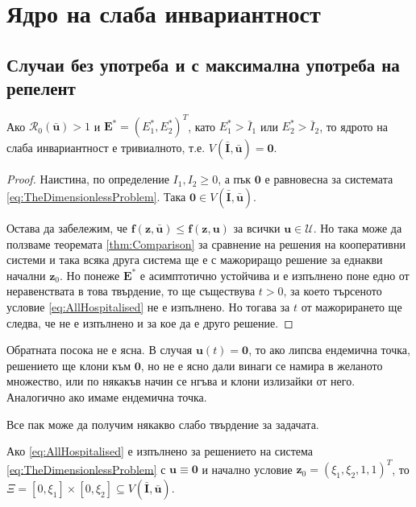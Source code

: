 \section{Ядро на слаба инвариантност}

\subsection{Случаи без употреба и с максимална употреба на репелент}

\begin{proposition}
  Ако $\mathscr{R}_0(\bar{\mathbf{u}}) > 1$ и $\mathbf{E}^* = (E_1^*, E_2^*)^T$, като $E_1^* > \bar{I}_1$ или $E_2^* > \bar{I}_2$, то ядрото на слаба инвариантност е тривиалното, т.е. $V(\bar{\mathbf{I}}, \bar{\mathbf{u}}) = {\mathbf{0}}$.
\end{proposition}

\begin{proof}
  Наистина, по определение $I_1, I_2 \geq 0$, а пък $\mathbf{0}$ е равновесна за системата \ref{eq:TheDimensionlessProblem}. Така $\mathbf{0} \in V(\bar{\mathbf{I}}, \bar{\mathbf{u}})$.

  Остава да забележим, че $\mathbf{f}(\mathbf{z}, \bar{\mathbf{u}}) \leq \mathbf{f}(\mathbf{z}, \mathbf{u})$ за всички $\mathbf{u} \in \mathscr{U}$.
  Но така може да ползваме теоремата \ref{thm:Comparison} за сравнение на решения на кооперативни системи и така всяка друга система ще е с мажориращо решение за еднакви начални $\mathbf{z}_0$. Но понеже $\mathbf{E}^*$ е асимптотично устойчива и е изпълнено поне едно от неравенствата в това твърдение, то ще съществува $t > 0$, за което търсеното условие \ref{eq:AllHospitalised} не е изпълнено. Но тогава за $t$ от мажорирането ще следва, че не е изпълнено и за кое да е друго решение.
\end{proof}

Обратната посока не е ясна. В случая $\mathbf{u}(t)=\mathbf{0}$, то ако липсва ендемична точка, решението ще клони към $\mathbf{0}$, но не е ясно дали винаги се намира в желаното множество, или по някакъв начин се нгъва и клони излизайки от него. Аналогично ако имаме ендемична точка.

Все пак може да получим някакво слабо твърдение за задачата.

\begin{proposition}
  Ако \ref{eq:AllHospitalised} е изпълнено за решението на система \ref{eq:TheDimensionlessProblem} с $\mathbf{u} \equiv \mathbf{0}$ и начално условие $\mathbf{z}_0 = (\xi_1, \xi_2, 1, 1)^T$, то $\Xi = [0, \xi_1] \times [0, \xi_2] \subseteq V(\bar{\mathbf{I}}, \bar{\mathbf{u}})$.
\end{proposition}

